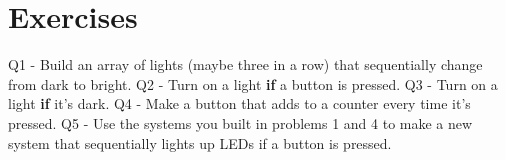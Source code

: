 \documentclass[a4paper]{article}
\begin{document}
\newpage
\section{Exercises}
Q1 -  Build an array of lights (maybe three in a row) that sequentially change from dark to bright.
\newline
Q2 -  Turn on a light \textbf{if} a button is pressed.
\newline
Q3 -  Turn on a light \textbf{if} it's dark.
\newline
Q4 -  Make a button that adds to a counter every time it's pressed.
\newline
Q5 -  Use the systems you built in problems 1 and 4 to make a new system that sequentially lights up LEDs if a button is pressed. 



\end{document}
